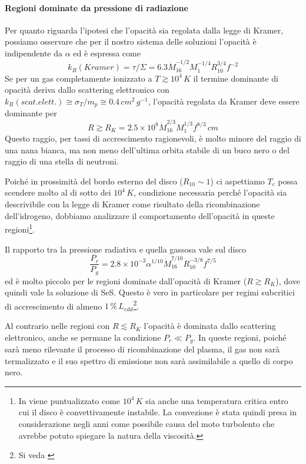 \documentclass[a4paperbi]{article}
\begin{document}
	\paragraph{Regioni dominate da pressione di radiazione}
	Per quanto riguarda l'ipotesi che l'opacità sia regolata dalla legge di Kramer, possiamo osservare che per il nostro sistema delle soluzioni l'opacità è indipendente da $\alpha$ ed è espressa come
	\begin{equation}
		k_R(Kramer)=\tau/\Sigma=6.3\dot{M}^{-1/2}_{16}M^{-1/4}_1R^{3/4}_{10}f^{-2}
	\end{equation}
	Se per un gas completamente ionizzato a $T\gtrsim10^4\,K$ il termine dominante di opacità deriva dallo scattering elettronico con $k_R(scat. elett.)\cong\sigma_T/m_p\cong0.4\,cm^2\,g^{-1}$, l'opacità regolata da Kramer deve essere dominante per	
	\begin{equation}
		R\gtrsim R_K=2.5\times10^8\dot{M}^{2/3}_{16}M^{1/3}_1f^{8/3}\,cm
	\end{equation}
	Questo raggio, per tassi di accrescimento ragionevoli, è molto minore del raggio di una nana bianca, ma non meno dell'ultima orbita stabile di un buco nero o del raggio di una stella di neutroni.
	
	Poiché in prossimità del bordo esterno del disco ($R_{10}\sim1$) ci aspettiamo $T_c$ possa scendere molto al di sotto dei $10^4\,K$, condizione necessaria perché l'opacità sia descrivibile con la legge di Kramer come risultato della ricombinazione dell'idrogeno, dobbiamo analizzare il comportamento dell'opacità in queste regioni\footnote{In \cite{Pringle1981} viene puntualizzato come $10^4\,K$ sia anche una temperatura critica entro cui il disco è convettivamente instabile. La convezione è stata quindi presa in considerazione negli anni come possibile causa del moto turbolento che avrebbe potuto spiegare la natura della viscosità.}.
	
	Il rapporto tra la pressione radiativa e quella gassosa vale sul disco
	\begin{equation}
		\frac{P_r}{P_g}=2.8\times10^{-3}\alpha^{1/10}\dot{M}^{7/10}_{16}R^{-3/8}_{10}f^{7/5}
	\end{equation}
ed è molto piccolo per le regioni dominate dall'opacità di Kramer ($R\gtrsim R_K$), dove quindi vale la soluzione di SeS. Questo è vero in particolare per regimi subcritici di accrescimento di almeno $1\,\%\,L_{edd}$\footnote{Si veda \cite{ShakuraSunyaev1973}}.
	
	Al contrario nelle regioni con $R\lesssim R_K$ l'opacità è dominata dallo scattering elettronico, anche se permane la condizione $P_r\ll P_g$. In queste regioni, poiché sarà meno rilevante il processo di ricombinazione del plasma, il gas non sarà termalizzato e il suo spettro di emissione non sarà assimilabile a quello di corpo nero.
\end{document}
